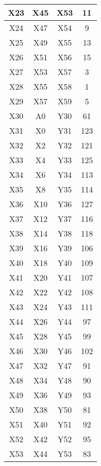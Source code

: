 \begin{longtable}{|c|c|c|c|}
  X23   & X45    & X53   & 11     \\ \hline
  X24   & X47    & X54   & 9      \\ \hline
  X25   & X49    & X55   & 13     \\ \hline
  X26   & X51    & X56   & 15     \\ \hline
  X27   & X53    & X57   & 3      \\ \hline
  X28   & X55    & X58   & 1      \\ \hline
  X29   & X57    & X59   & 5      \\ \hline
  X30   & A0     & Y30   & 61     \\ \hline
  X31   & X0     & Y31   & 123    \\ \hline
  X32   & X2     & Y32   & 121    \\ \hline
  X33   & X4     & Y33   & 125    \\ \hline
  X34   & X6     & Y34   & 113    \\ \hline
  X35   & X8     & Y35   & 114    \\ \hline
  X36   & X10    & Y36   & 127    \\ \hline
  X37   & X12    & Y37   & 116    \\ \hline
  X38   & X14    & Y38   & 118    \\ \hline
  X39   & X16    & Y39   & 106    \\ \hline
  X40   & X18    & Y40   & 109    \\ \hline
  X41   & X20    & Y41   & 107    \\ \hline
  X42   & X22    & Y42   & 108    \\ \hline
  X43   & X24    & Y43   & 111    \\ \hline
  X44   & X26    & Y44   & 97     \\ \hline
  X45   & X28    & Y45   & 99     \\ \hline
  X46   & X30    & Y46   & 102    \\ \hline
  X47   & X32    & Y47   & 91     \\ \hline
  X48   & X34    & Y48   & 90     \\ \hline
  X49   & X36    & Y49   & 93     \\ \hline
  X50   & X38    & Y50   & 81     \\ \hline
  X51   & X40    & Y51   & 92     \\ \hline
  X52   & X42    & Y52   & 95     \\ \hline
  X53   & X44    & Y53   & 83     \\ \hline

\end{longtable}
